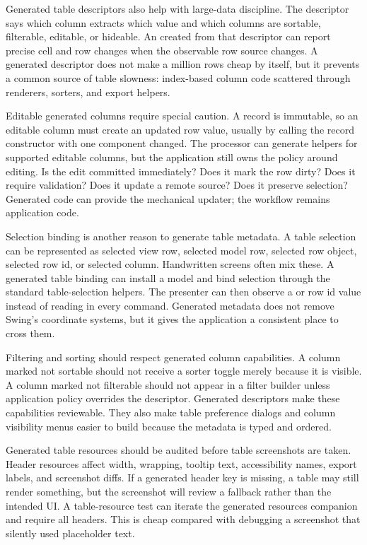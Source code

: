 Generated table descriptors also help with large-data discipline. The
descriptor says which column extracts which value and which columns are
sortable, filterable, editable, or hideable. An 
created from that descriptor can report precise cell and row changes when the
observable row source changes. A generated descriptor does not make a million
rows cheap by itself, but it prevents a common source of table slowness:
index-based column code scattered through renderers, sorters, and export
helpers.

Editable generated columns require special caution. A record is immutable, so
an editable column must create an updated row value, usually by calling the
record constructor with one component changed. The processor can generate
helpers for supported editable columns, but the application still owns the
policy around editing. Is the edit committed immediately? Does it mark the
row dirty? Does it require validation? Does it update a remote source? Does it
preserve selection? Generated code can provide the mechanical updater; the
workflow remains application code.

Selection binding is another reason to generate table metadata. A table
selection can be represented as selected view row, selected model row, selected
row object, selected row id, or selected column. Handwritten screens often mix
these. A generated table binding can install a model and bind selection
through the standard table-selection helpers. The presenter can then observe a
 or row id value instead of reading
 in every command. Generated metadata does not
remove Swing's coordinate systems, but it gives the application a consistent
place to cross them.

Filtering and sorting should respect generated column capabilities. A column
marked not sortable should not receive a sorter toggle merely because it is
visible. A column marked not filterable should not appear in a filter builder
unless application policy overrides the descriptor. Generated descriptors make
these capabilities reviewable. They also make table preference dialogs and
column visibility menus easier to build because the metadata is typed and
ordered.

Generated table resources should be audited before table screenshots are
taken. Header resources affect width, wrapping, tooltip text, accessibility
names, export labels, and screenshot diffs. If a generated header key is
missing, a table may still render something, but the screenshot will review a
fallback rather than the intended UI. A table-resource test can iterate the
generated resources companion and require all headers. This is cheap compared
with debugging a screenshot that silently used placeholder text.

